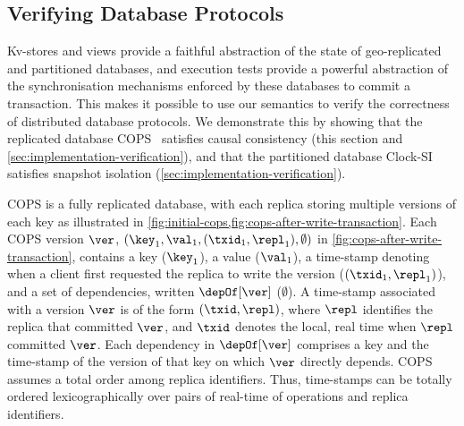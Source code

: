 \subsection{Verifying Database Protocols}
\label{sec:verify-impl}
Kv-stores and views provide a 
faithful abstraction of the state of geo-replicated and partitioned
databases, and  execution tests provide a powerful abstraction of the synchronisation mechanisms 
enforced by these databases to commit a transaction. This makes it
possible to use our 
semantics to verify the correctness of distributed database protocols. 
We  demonstrate this by showing that  the replicated database 
COPS~\cite{cops} satisfies causal consistency  (this section and \cref{sec:implementation-verification}), and that
the partitioned database Clock-SI~\cite{clocksi} satisfies snapshot isolation (\cref{sec:implementation-verification}).




COPS is a fully replicated database, with each replica storing multiple versions of each key as illustrated in \cref{fig:initial-cops,fig:cops-after-write-transaction}. 
Each COPS version \( \ver \),
\eg \( (\key_1,\val_1,(\txid_1,\repl_1), \emptyset) \) in \cref{fig:cops-after-write-transaction},
contains a key (\eg $\key_1$), a value (\eg $\val_1$), a time-stamp denoting when a client first requested the
replica to write the version (\eg $(\txid_1, \repl_1)$), and a set of dependencies, written $\depOf[\ver]$ (\eg $\emptyset$). 
A time-stamp associated with a version $\ver$ is of the form $(\txid, \repl)$, where $\repl$ identifies the replica that committed $\ver$, and $\txid$ denotes the local, real time when $\repl$ committed $\ver$. 
Each dependency in $\depOf[\ver]$ comprises a key and the time-stamp of the version of that key on which $\ver$ directly depends.  
COPS assumes a total order among replica identifiers. Thus,  time-stamps can be
totally ordered lexicographically over pairs of real-time of
operations and replica identifiers.

